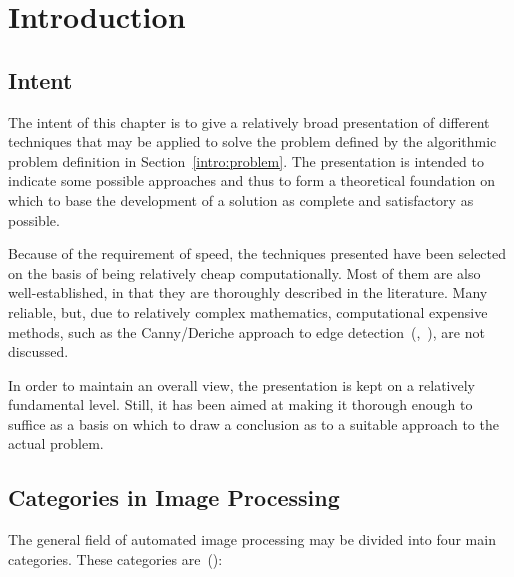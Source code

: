 
\section{Introduction}
\label{image:intro}

\subsection{Intent}
\label{image:intro:intent}

The intent of this chapter is to give a relatively broad presentation
of different techniques that may be applied to solve the problem
defined by the algorithmic problem definition in
Section~\ref{intro:problem}.  The presentation is intended to indicate
some possible approaches and thus to form a theoretical foundation on
which to base the development of a solution as complete and
satisfactory as possible.

Because of the requirement of speed, the techniques presented have
been selected on the basis of being relatively cheap computationally.
Most of them are also well-established, in that they are thoroughly
described in the literature.  Many reliable, but, due to relatively
complex mathematics, computational expensive methods, such as the
Canny/Deriche approach to edge
detection~(\cite{canny},~\cite{deriche}), are not discussed.

In order to maintain an overall view, the presentation is kept on a
relatively fundamental level.  Still, it has been aimed at making it
thorough enough to suffice as a basis on which to draw a conclusion
as to a suitable approach to the actual problem.

\subsection{Categories in Image Processing}
\label{image:intro:categories}

The general field of automated image processing may be divided into
four main categories.  These categories are~(\cite{digim}):


